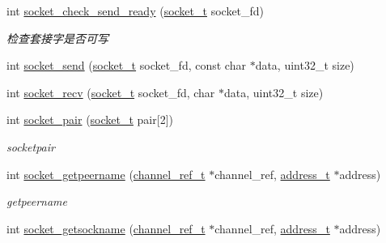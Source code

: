 \begin{DoxyCompactItemize}
\item 
int \hyperlink{a00081_a8afd26cc26824e35f1ec942d2c367c2b_a8afd26cc26824e35f1ec942d2c367c2b}{socket\+\_\+check\+\_\+send\+\_\+ready} (\hyperlink{a00050_a0d9e0afbf02fb6ed6c5b1415dce51b05_a0d9e0afbf02fb6ed6c5b1415dce51b05}{socket\+\_\+t} socket\+\_\+fd)
\begin{DoxyCompactList}\small\item\em 检查套接字是否可写 \end{DoxyCompactList}\item 
int \hyperlink{a00081_a1acbefba637d7c0c3fd77355f84d4c22_a1acbefba637d7c0c3fd77355f84d4c22}{socket\+\_\+send} (\hyperlink{a00050_a0d9e0afbf02fb6ed6c5b1415dce51b05_a0d9e0afbf02fb6ed6c5b1415dce51b05}{socket\+\_\+t} socket\+\_\+fd, const char $\ast$data, uint32\+\_\+t size)
\item 
int \hyperlink{a00081_a8a4b901f1586de59d1d0a88d3326c934_a8a4b901f1586de59d1d0a88d3326c934}{socket\+\_\+recv} (\hyperlink{a00050_a0d9e0afbf02fb6ed6c5b1415dce51b05_a0d9e0afbf02fb6ed6c5b1415dce51b05}{socket\+\_\+t} socket\+\_\+fd, char $\ast$data, uint32\+\_\+t size)
\item 
int \hyperlink{a00081_a64d681185ca861b010c81db7479e9e08_a64d681185ca861b010c81db7479e9e08}{socket\+\_\+pair} (\hyperlink{a00050_a0d9e0afbf02fb6ed6c5b1415dce51b05_a0d9e0afbf02fb6ed6c5b1415dce51b05}{socket\+\_\+t} pair\mbox{[}2\mbox{]})
\begin{DoxyCompactList}\small\item\em socketpair \end{DoxyCompactList}\item 
int \hyperlink{a00081_af9dec30d9e18787252fecc0de537843f_af9dec30d9e18787252fecc0de537843f}{socket\+\_\+getpeername} (\hyperlink{a00050_a151271c9d188ef28d4d24bb81dcc1263_a151271c9d188ef28d4d24bb81dcc1263}{channel\+\_\+ref\+\_\+t} $\ast$channel\+\_\+ref, \hyperlink{a00050_a7a6e75b85c8b441f843bd40004a7d9d5_a7a6e75b85c8b441f843bd40004a7d9d5}{address\+\_\+t} $\ast$address)
\begin{DoxyCompactList}\small\item\em getpeername \end{DoxyCompactList}\item 
int \hyperlink{a00081_ad427473485df55e150741186f3ef2879_ad427473485df55e150741186f3ef2879}{socket\+\_\+getsockname} (\hyperlink{a00050_a151271c9d188ef28d4d24bb81dcc1263_a151271c9d188ef28d4d24bb81dcc1263}{channel\+\_\+ref\+\_\+t} $\ast$channel\+\_\+ref, \hyperlink{a00050_a7a6e75b85c8b441f843bd40004a7d9d5_a7a6e75b85c8b441f843bd40004a7d9d5}{address\+\_\+t} $\ast$address)

\end{DoxyCompactItemize}
